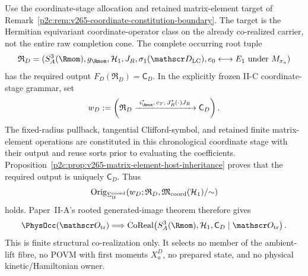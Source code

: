 \documentclass[12pt,a4paper]{article}
\begin{document}
\begin{corollary}
\label{p2c:cor:intrinsic-coordinate-class-corealization}
Use the coordinate-stage allocation and retained matrix-element target
of Remark~\ref{p2c:rem:v265-coordinate-constitution-boundary}.
The target is the Hermitian equivariant coordinate-operator class on the
already co-realized carrier, not the entire raw completion cone.  The complete
occurring root tuple
\[
 \mathfrak R_D=
 (S^3_A(\Rmom),g_{\Rmom},\mathcal H_1,J_R,
   \sigma_1(\mathscr D_{\rm LC}),
   e_0\longleftrightarrow E_1\ \text{under }M_{x_a})
\]
has the required output \(F_D(\mathfrak R_D)=\mathsf C_D\).  In the explicitly frozen
II-C coordinate-stage grammar, set
\[
 w_D:=
 \left(
 \mathfrak R_D
 \xrightarrow{\ i_{\Rmom}^*,\,c_T,\,J_R^*(\cdot)J_R\ }
 \mathsf C_D
 \right).
\]
The fixed-radius pullback, tangential Clifford-symbol, and retained
finite matrix-element operations are constituted in this chronological
coordinate stage with their output and reuse sorts prior to evaluating the
coefficients.  Proposition~\ref{p2c:prop:v265-matrix-element-host-inheritance}
proves that the required output is uniquely \(\mathsf C_D\).  Thus
\[
 \operatorname{Orig}_{\Sigma_{\rm II}^{\rm coord}}
 (w_D;\mathfrak R_D,\mathfrak M_{\rm coord}(\mathcal H_1)/{\sim})
\]
holds.  Paper~II-A's rooted generated-image theorem therefore gives
\[
 \PhysOcc(\mathscr O_{\rm tr})
 \Longrightarrow
 \operatorname{CoReal}\!\left(
 S^3_A(\Rmom),\mathcal H_1,\mathsf C_D
 \mid\mathscr O_{\rm tr}\right).
\]
This is finite structural co-realization only.  It selects no member of the
ambient-lift fibre, no POVM with first moments \(X_a^D\), no prepared state,
and no physical kinetic/Hamiltonian owner.
\end{corollary}
\end{document}
